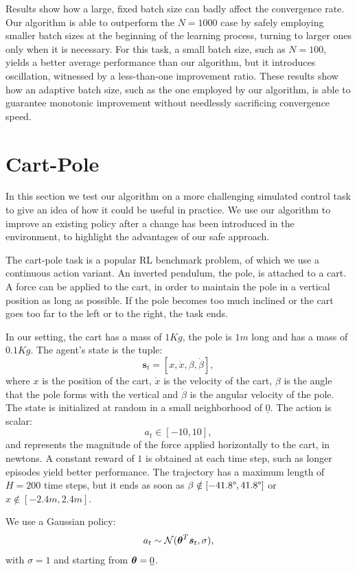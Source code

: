 Results show how a large, fixed batch size can badly affect the convergence rate. Our algorithm is able to outperform the $N=1000$ case by safely employing smaller batch sizes at the beginning of the learning process, turning to larger ones only when it is necessary.
For this task, a small batch size, such as $N=100$, yields a better average performance than our algorithm, but it introduces oscillation, witnessed by a less-than-one improvement ratio.
These results show how an adaptive batch size, such as the one employed by our algorithm, is able to guarantee monotonic improvement without needlessly sacrificing convergence speed.

\section{Cart-Pole}\label{sec:cartpole}
In this section we test our algorithm on a more challenging simulated control task to give an idea of how it could be useful in practice. We use our algorithm to improve an existing policy after a change has been introduced in the environment, to highlight the advantages of our safe approach.

The cart-pole task is a popular \ac{RL} benchmark problem, of which we use a continuous action variant. An inverted pendulum, the pole, is attached to a cart. A force can be applied to the cart, in order to maintain the pole in a vertical position as long as possible. If the pole becomes too much inclined or the cart goes too far to the left or to the right, the task ends.

In our setting, the cart has a mass of $1Kg$, the pole is $1m$ long and has a mass of $0.1Kg$.
The agent's state is the tuple:
\[
	\boldsymbol{s}_t = [x,\dot{x},\beta,\dot{\beta}],
\]
where $x$ is the position of the cart, $\dot{x}$ is the velocity of the cart, $\beta$ is the angle that the pole forms with the vertical and $\dot{\beta}$ is the angular velocity of the pole. The state is initialized at random in a small neighborhood of $\underline{0}$.
The action is scalar:
\[
	a_t \in [-10,10],
\]
and represents the magnitude of the force applied horizontally to the cart, in newtons.
A constant reward of $1$ is obtained at each time step, such as longer episodes yield better performance. The trajectory has a maximum length of $H=200$ time steps, but it ends as soon as $\beta \notin [-41.8\degree,41.8\degree]$ or $x \notin [-2.4m, 2.4m]$.

We use a Gaussian policy:
\[
	a_t \sim \mathcal{N}(\boldsymbol{\theta}^T\boldsymbol{s}_t,\sigma),	
\]
with $\sigma=1$ and starting from $\boldsymbol{\theta}=\underline{0}$.

